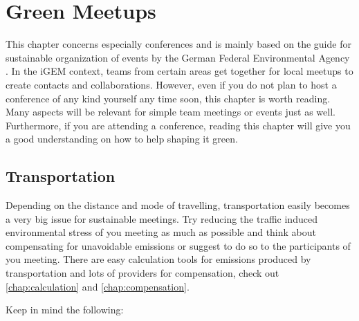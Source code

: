 
\chapter{Green Meetups}\label{chap:meetup}
This chapter concerns especially conferences and is mainly based on the guide for sustainable organization of events by the German Federal Environmental Agency \cite{meeting}. In the iGEM context, teams from certain areas get together for local meetups to create contacts and collaborations. However, even if you do not plan to host a conference of any kind yourself any time soon, this chapter is worth reading. Many aspects will be relevant for simple team meetings or events just as well. Furthermore, if you are attending a conference, reading this chapter will give you a good understanding on how to help shaping it green.

\section{Transportation}
Depending on the distance and mode of travelling, transportation easily becomes a very big issue for sustainable meetings. Try reducing the traffic induced environmental stress of you meeting as much as possible and think about compensating for unavoidable emissions or suggest to do so to the participants of you meeting. There are easy calculation tools for emissions produced by transportation and lots of providers for compensation, check out \cref{chap:calculation} and \cref{chap:compensation}.
	
Keep in mind the following:

